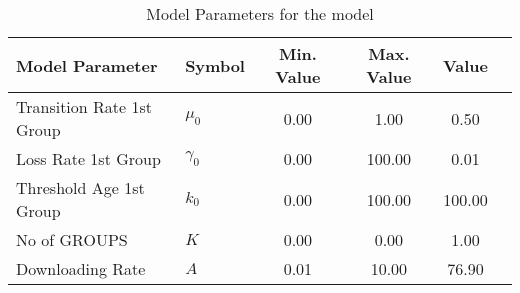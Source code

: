 \begin{table}
\centering
\begin{tabular}{p{5cm}lcccc}
{\bf Model Parameter} & {\bf Symbol} & {\bf Min. Value} & {\bf Max. Value} & {\bf Value}\\
\hline\hline
Transition Rate 1st Group & $\mu_0$ & 0.00 & 1.00 & 0.50\\
Loss Rate 1st Group & $\gamma_0$ & 0.00 & 100.00 & 0.01\\
Threshold Age 1st Group & $k_0$ & 0.00 & 100.00 & 100.00\\
No of GROUPS & $K$ & 0.00 & 0.00 & 1.00\\
Downloading Rate & $A$ & 0.01 & 10.00 & 76.90\\
\hline\hline
\end{tabular}
\caption{Model Parameters for the model}
\end{table}
